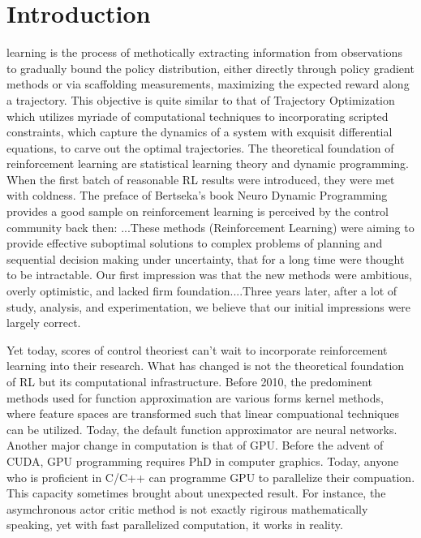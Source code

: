 \documentclass[journal]{IEEEtran}
\begin{document}
\section{Introduction}
 learning is the process of methotically extracting information from observations to gradually bound the policy distribution, either directly through policy gradient methods or via scaffolding measurements, maximizing the expected reward along a trajectory. This objective is quite similar to that of Trajectory Optimization which utilizes myriade of computational techniques to incorporating scripted constraints, which capture the dynamics of a system with exquisit differential equations, to carve out the optimal trajectories. The theoretical foundation of reinforcement learning are statistical learning theory and dynamic programming. When the first batch of reasonable RL results were introduced, they were met with coldness. The preface of Bertseka's book Neuro Dynamic Programming provides a good sample on reinforcement learning is perceived by the control community back then: ...These methods (Reinforcement Learning) were aiming to provide effective suboptimal solutions to complex problems of planning and sequential decision making under uncertainty, that for a long time were thought to be intractable. Our first impression was that the new methods were ambitious, overly optimistic, and lacked firm foundation....Three years later, after a lot of study, analysis, and experimentation, we believe that our initial impressions were largely correct. \cite{Bertsekas1996NeuroDynamicP}

Yet today, scores of control theoriest can't wait to incorporate reinforcement learning into their research. What has changed is not the theoretical foundation of RL but its computational infrastructure. Before 2010, the predominent methods used for function approximation are various forms kernel methods, where feature spaces are transformed such that linear compuational techniques can be utilized. Today, the default function approximator are neural networks. Another major change in computation is that of GPU. Before the advent of CUDA, GPU programming requires PhD in computer graphics. Today, anyone who is proficient in C/C++ can programme GPU to parallelize their compuation. This capacity sometimes brought about unexpected result. For instance, the asymchronous actor critic method is not exactly rigirous mathematically speaking, yet with fast parallelized computation, it works in reality.
\end{document}

